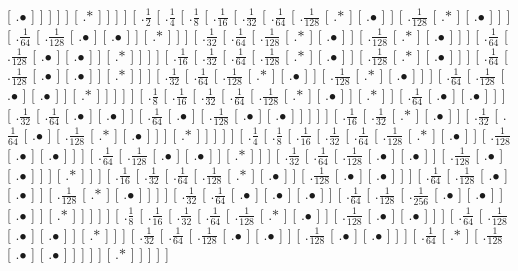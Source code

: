 \documentclass[a4paper,10pt]{article}
\begin{document}
\begin{landscape}
{ [ .$\bullet$ ]  ]  ]  ]  ]  [ .$*$ ]  ]  ]  ]  [ .$\frac{1}{2}$  [ .$\frac{1}{4}$  [ .$\frac{1}{8}$  [ .$\frac{1}{16}$  [ .$\frac{1}{32}$  [ .$\frac{1}{64}$  [ .$\frac{1}{128}$  [ .$*$ ]  [ .$\bullet$ ]  ]  [ .$\frac{1}{128}$  [ .$*$ ]  [ .$\bullet$ ]  ]  ]  [ .$\frac{1}{64}$  [ .$\frac{1}{128}$  [ .$\bullet$ ]  [ .$\bullet$ ]  ]  [ .$*$ ]  ]  ]  [ .$\frac{1}{32}$  [ .$\frac{1}{64}$  [ .$\frac{1}{128}$  [ .$*$ ]  [ .$\bullet$ ]  ]  [ .$\frac{1}{128}$  [ .$*$ ]  [ .$\bullet$ ]  ]  ]  [ .$\frac{1}{64}$  [ .$\frac{1}{128}$  [ .$\bullet$ ]  [ .$\bullet$ ]  ]  [ .$*$ ]  ]  ]  ]  [ .$\frac{1}{16}$  [ .$\frac{1}{32}$  [ .$\frac{1}{64}$  [ .$\frac{1}{128}$  [ .$*$ ]  [ .$\bullet$ ]  ]  [ .$\frac{1}{128}$  [ .$*$ ]  [ .$\bullet$ ]  ]  ]  [ .$\frac{1}{64}$  [ .$\frac{1}{128}$  [ .$\bullet$ ]  [ .$\bullet$ ]  ]  [ .$*$ ]  ]  ]  [ .$\frac{1}{32}$  [ .$\frac{1}{64}$  [ .$\frac{1}{128}$  [ .$*$ ]  [ .$\bullet$ ]  ]  [ .$\frac{1}{128}$  [ .$*$ ]  [ .$\bullet$ ]  ]  ]  [ .$\frac{1}{64}$  [ .$\frac{1}{128}$  [ .$\bullet$ ]  [ .$\bullet$ ]  ]  [ .$*$ ]  ]  ]  ]  ]  [ .$\frac{1}{8}$  [ .$\frac{1}{16}$  [ .$\frac{1}{32}$  [ .$\frac{1}{64}$  [ .$\frac{1}{128}$  [ .$*$ ]  [ .$\bullet$ ]  ]  [ .$*$ ]  ]  [ .$\frac{1}{64}$  [ .$\bullet$ ]  [ .$\bullet$ ]  ]  ]  [ .$\frac{1}{32}$  [ .$\frac{1}{64}$  [ .$\bullet$ ]  [ .$\bullet$ ]  ]  [ .$\frac{1}{64}$  [ .$\bullet$ ]  [ .$\frac{1}{128}$  [ .$\bullet$ ]  [ .$\bullet$ ]  ]  ]  ]  ]  [ .$\frac{1}{16}$  [ .$\frac{1}{32}$  [ .$*$ ]  [ .$\bullet$ ]  ]  [ .$\frac{1}{32}$  [ .$\frac{1}{64}$  [ .$\bullet$ ]  [ .$\frac{1}{128}$  [ .$*$ ]  [ .$\bullet$ ]  ]  ]  [ .$*$ ]  ]  ]  ]  ]  [ .$\frac{1}{4}$  [ .$\frac{1}{8}$  [ .$\frac{1}{16}$  [ .$\frac{1}{32}$  [ .$\frac{1}{64}$  [ .$\frac{1}{128}$  [ .$*$ ]  [ .$\bullet$ ]  ]  [ .$\frac{1}{128}$  [ .$\bullet$ ]  [ .$\bullet$ ]  ]  ]  [ .$\frac{1}{64}$  [ .$\frac{1}{128}$  [ .$\bullet$ ]  [ .$\bullet$ ]  ]  [ .$*$ ]  ]  ]  [ .$\frac{1}{32}$  [ .$\frac{1}{64}$  [ .$\frac{1}{128}$  [ .$\bullet$ ]  [ .$\bullet$ ]  ]  [ .$\frac{1}{128}$  [ .$\bullet$ ]  [ .$\bullet$ ]  ]  ]  [ .$*$ ]  ]  ]  [ .$\frac{1}{16}$  [ .$\frac{1}{32}$  [ .$\frac{1}{64}$  [ .$\frac{1}{128}$  [ .$*$ ]  [ .$\bullet$ ]  ]  [ .$\frac{1}{128}$  [ .$\bullet$ ]  [ .$\bullet$ ]  ]  ]  [ .$\frac{1}{64}$  [ .$\frac{1}{128}$  [ .$\bullet$ ]  [ .$\bullet$ ]  ]  [ .$\frac{1}{128}$  [ .$*$ ]  [ .$\bullet$ ]  ]  ]  ]  [ .$\frac{1}{32}$  [ .$\frac{1}{64}$  [ .$\bullet$ ]  [ .$\bullet$ ]  [ .$\bullet$ ]  ]  [ .$\frac{1}{64}$  [ .$\frac{1}{128}$  [ .$\frac{1}{256}$  [ .$\bullet$ ]  [ .$\bullet$ ]  ]  [ .$\bullet$ ]  ]  [ .$*$ ]  ]  ]  ]  ]  [ .$\frac{1}{8}$  [ .$\frac{1}{16}$  [ .$\frac{1}{32}$  [ .$\frac{1}{64}$  [ .$\frac{1}{128}$  [ .$*$ ]  [ .$\bullet$ ]  ]  [ .$\frac{1}{128}$  [ .$\bullet$ ]  [ .$\bullet$ ]  ]  ]  [ .$\frac{1}{64}$  [ .$\frac{1}{128}$  [ .$\bullet$ ]  [ .$\bullet$ ]  ]  [ .$*$ ]  ]  ]  [ .$\frac{1}{32}$  [ .$\frac{1}{64}$  [ .$\frac{1}{128}$  [ .$\bullet$ ]  [ .$\bullet$ ]  ]  [ .$\frac{1}{128}$  [ .$\bullet$ ]  [ .$\bullet$ ]  ]  ]  [ .$\frac{1}{64}$  [ .$*$ ]  [ .$\frac{1}{128}$  [ .$\bullet$ ]  [ .$\bullet$ ]  ]  ]  ]  ]  [ .$*$ ]  ]  ]  ]  ] 
}

\end{landscape}
\end{document}
